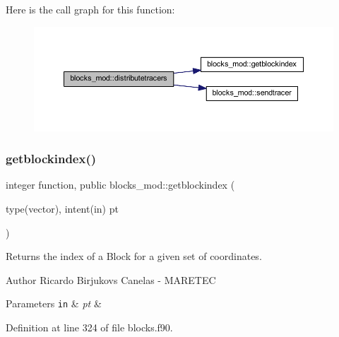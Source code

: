 Here is the call graph for this function\+:
\nopagebreak
\begin{figure}[H]
\begin{center}
\leavevmode
\includegraphics[width=350pt]{namespaceblocks__mod_aa178415bcc40cf169744d356e1a09c6b_cgraph}
\end{center}
\end{figure}
\mbox{\label{namespaceblocks__mod_a62e8fb0d6b2535b4499c7a4d848c24ba}} 
\subsubsection{\texorpdfstring{getblockindex()}{getblockindex()}}
{\footnotesize\ttfamily integer function, public blocks\+\_\+mod\+::getblockindex (\begin{DoxyParamCaption}\item[{type(vector), intent(in)}]{pt }\end{DoxyParamCaption})}



Returns the index of a Block for a given set of coordinates. 

\begin{DoxyAuthor}{Author}
Ricardo Birjukovs Canelas -\/ M\+A\+R\+E\+T\+EC 
\end{DoxyAuthor}

\begin{DoxyParams}[1]{Parameters}
\mbox{\tt in}  & {\em pt} & \\
\hline
\end{DoxyParams}


Definition at line 324 of file blocks.\+f90.


